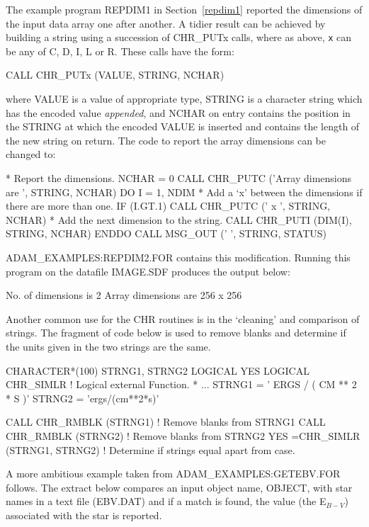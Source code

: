 \documentclass[twoside,11pt,nolof]{starlink}
\begin{document}
The example program REPDIM1 in Section~\ref{repdim1} reported the dimensions of
the input data array one after another.
A tidier result can be achieved by building a  string using a succession of
CHR\_PUTx calls, where as above, \texttt{x} can be any of C, D, I, L or  R.
These calls have the form:
\begin{terminalv}
      CALL CHR_PUTx (VALUE, STRING, NCHAR)
\end{terminalv}
where VALUE is a value of appropriate type, STRING is a character string which
has the encoded value {\sl appended},  and NCHAR on entry contains the
position in the STRING at which the encoded VALUE is inserted and contains
the length of the new string on return.
The code to report the array dimensions can be changed to:
\begin{terminalv}
*   Report the dimensions.
      NCHAR = 0
      CALL CHR_PUTC ('Array dimensions are ', STRING, NCHAR)
      DO  I = 1, NDIM
*      Add a `x' between the dimensions if there are more than one.
         IF (I.GT.1) CALL CHR_PUTC (' x ', STRING, NCHAR)
*      Add the next dimension to the string.
         CALL CHR_PUTI (DIM(I), STRING, NCHAR)
      ENDDO
      CALL MSG_OUT ('  ', STRING, STATUS)
\end{terminalv}
ADAM\_EXAMPLES:REPDIM2.FOR contains this modification.
Running this program on the datafile IMAGE.SDF produces the output below:
\begin{terminalv}
No. of dimensions is 2
Array dimensions are 256 x 256
\end{terminalv}
Another common use for the CHR routines is in the `cleaning' and
comparison  of strings.
The fragment of code below is used to remove blanks and
determine if the units given in the two strings are the same.
\begin{terminalv}
      CHARACTER*(100) STRNG1, STRNG2
      LOGICAL YES
      LOGICAL CHR_SIMLR                   ! Logical external Function.
*     ...
      STRNG1 = '   ERGS / ( CM ** 2 * S )'
      STRNG2 = 'ergs/(cm**2*s)'

      CALL CHR_RMBLK (STRNG1)         ! Remove blanks from STRNG1
      CALL CHR_RMBLK (STRNG2)         ! Remove blanks from STRNG2
      YES =CHR_SIMLR (STRNG1, STRNG2) ! Determine if strings equal apart from case.
\end{terminalv}
\newpage
A more ambitious example taken from ADAM\_EXAMPLES:GETEBV.FOR follows.
The  extract below compares an input object name, OBJECT,
with star names
in a text file (EBV.DAT) and if a match is found, the
value (the E$_{B-V}$) associated with the star is reported.
\end{document}
